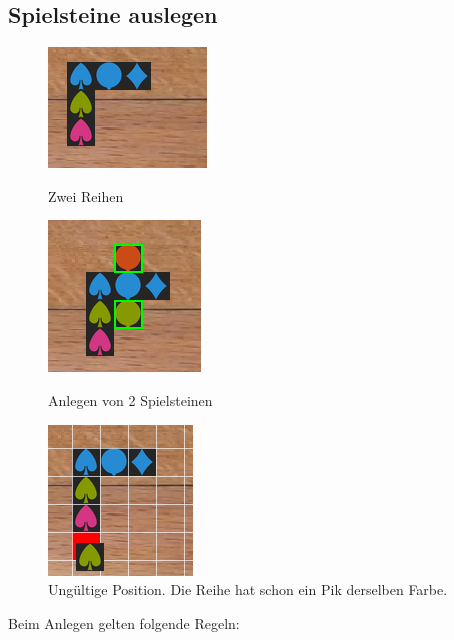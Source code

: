\documentclass[a4paper, ngerman]{scrartcl}
\begin{document}
\subsection{Spielsteine auslegen}
\begin{figure}
	\centering
	\begin{subfigures}
		\includegraphics[scale = 0.7]{images/anlegen01}
		\caption{Zwei Reihen}
		\label{fig:Anlegen01}
		\vspace{8pt}
		
		\includegraphics[scale = 0.7]{images/anlegen04}
		\caption{Anlegen von 2 Spielsteinen}
		\label{fig:Anlegen02}
		\vspace{8pt}
		
		\includegraphics[scale = 0.7]{images/anlegen02}
		\caption{Ungültige Position. Die Reihe hat schon ein Pik derselben Farbe.}
		\label{fig:Anlegen03}
	\end{subfigures}	
\end{figure}
Beim Anlegen gelten folgende Regeln:
\end{document}
